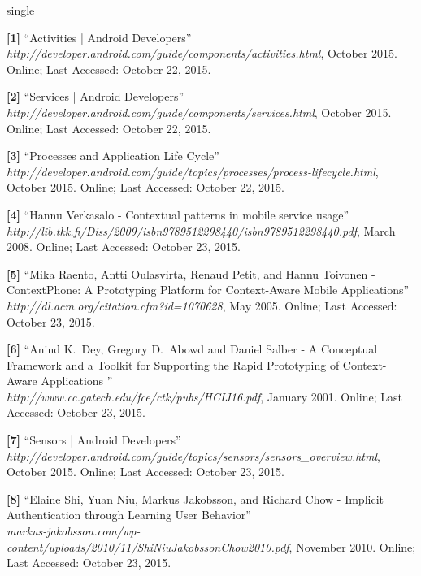 \documentclass[12pt]{uthesis-v12}  %
\begin{document}
\begin{referencelist}{single}

	\item \textbf{[1]} ``Activities | Android Developers''
	\\\emph{http://developer.android.com/guide/components/activities.html}, October 2015. 
	Online; Last Accessed: October 22, 2015.					     

	\item \textbf{[2]} ``Services | Android Developers''
	\\\emph{http://developer.android.com/guide/components/services.html}, October 2015. 
	Online; Last Accessed: October 22, 2015.
	
	\item \textbf{[3]} ``Processes and Application Life Cycle''
	\\\emph{http://developer.android.com/guide/topics/processes/process-lifecycle.html}, October 2015. 
	Online; Last Accessed: October 22, 2015.
		
	\item \textbf{[4]} ``Hannu Verkasalo - Contextual patterns in mobile service usage''
	\\\emph{http://lib.tkk.fi/Diss/2009/isbn9789512298440/isbn9789512298440.pdf}, March 2008. 
	Online; Last Accessed: October 23, 2015.
			
	\item \textbf{[5]} ``Mika Raento, Antti Oulasvirta, Renaud Petit, and Hannu Toivonen - ContextPhone: A Prototyping Platform for Context-Aware Mobile Applications''
	\\\emph{http://dl.acm.org/citation.cfm?id=1070628}, May 2005. 
	Online; Last Accessed: October 23, 2015.
	
	\item \textbf{[6]} ``Anind K.~Dey, Gregory D.~Abowd and Daniel Salber - A Conceptual Framework and a Toolkit for Supporting the Rapid Prototyping of Context-Aware Applications ''
	\\\emph{http://www.cc.gatech.edu/fce/ctk/pubs/HCIJ16.pdf}, January 2001. 
	Online; Last Accessed: October 23, 2015.
	
	\item \textbf{[7]} ``Sensors | Android Developers''
	\\\emph{http://developer.android.com/guide/topics/sensors/sensors\_overview.html}, October 2015. 
	Online; Last Accessed: October 23, 2015.
	
	\item \textbf{[8]} ``Elaine Shi, Yuan Niu, Markus Jakobsson, and Richard Chow - Implicit Authentication through Learning User Behavior''
	\\\emph{markus-jakobsson.com/wp-content/uploads/2010/11/ShiNiuJakobssonChow2010.pdf}, November 2010. 
	Online; Last Accessed: October 23, 2015.


\end{referencelist}
\end{document}
